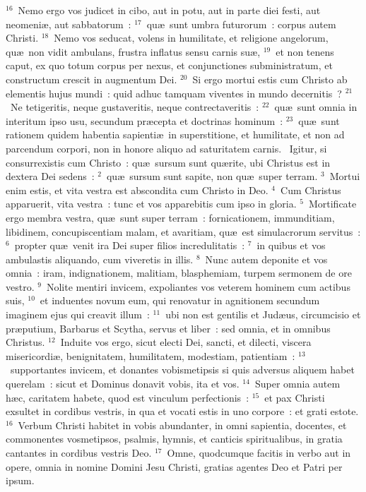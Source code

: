${}^{16}$~Nemo ergo vos judicet in cibo, aut in potu, aut in parte diei festi, aut neomeni\ae , aut sabbatorum~:
${}^{17}$~qu\ae\ sunt umbra futurorum~: corpus autem Christi.
${}^{18}$~Nemo vos seducat, volens in humilitate, et religione angelorum, qu\ae\ non vidit ambulans, frustra inflatus sensu carnis su\ae ,
${}^{19}$~et non tenens caput, ex quo totum corpus per nexus, et conjunctiones subministratum, et constructum crescit in augmentum Dei.
${}^{20}$~Si ergo mortui estis cum Christo ab elementis hujus mundi~: quid adhuc tamquam viventes in mundo decernitis~?
${}^{21}$~Ne tetigeritis, neque gustaveritis, neque contrectaveritis~:
${}^{22}$~qu\ae\ sunt omnia in interitum ipso usu, secundum pr\ae cepta et doctrinas hominum~:
${}^{23}$~qu\ae\ sunt rationem quidem habentia sapienti\ae\ in superstitione, et humilitate, et non ad parcendum corpori, non in honore aliquo ad saturitatem carnis.
~\lettrine[lines=10,image=true,loversize=0.05,lraise=-0.03]{I}{}gitur, si consurrexistis cum Christo~: qu\ae\ sursum sunt qu\ae rite, ubi Christus est in dextera Dei sedens~:
${}^{2}$~qu\ae\ sursum sunt sapite, non qu\ae\ super terram.
${}^{3}$~Mortui enim estis, et vita vestra est abscondita cum Christo in Deo.
${}^{4}$~Cum Christus apparuerit, vita vestra~: tunc et vos apparebitis cum ipso in gloria.
${}^{5}$~Mortificate ergo membra vestra, qu\ae\ sunt super terram~: fornicationem, immunditiam, libidinem, concupiscentiam malam, et avaritiam, qu\ae\ est simulacrorum servitus~:
${}^{6}$~propter qu\ae\ venit ira Dei super filios incredulitatis~:
${}^{7}$~in quibus et vos ambulastis aliquando, cum viveretis in illis.
${}^{8}$~Nunc autem deponite et vos omnia~: iram, indignationem, malitiam, blasphemiam, turpem sermonem de ore vestro.
${}^{9}$~Nolite mentiri invicem, expoliantes vos veterem hominem cum actibus suis,
${}^{10}$~et induentes novum eum, qui renovatur in agnitionem secundum imaginem ejus qui creavit illum~:
${}^{11}$~ubi non est gentilis et Jud\ae us, circumcisio et pr\ae putium, Barbarus et Scytha, servus et liber~: sed omnia, et in omnibus Christus.
${}^{12}$~Induite vos ergo, sicut electi Dei, sancti, et dilecti, viscera misericordi\ae , benignitatem, humilitatem, modestiam, patientiam~:
${}^{13}$~supportantes invicem, et donantes vobismetipsis si quis adversus aliquem habet querelam~: sicut et Dominus donavit vobis, ita et vos.
${}^{14}$~Super omnia autem h\ae c, caritatem habete, quod est vinculum perfectionis~:
${}^{15}$~et pax Christi exsultet in cordibus vestris, in qua et vocati estis in uno corpore~: et grati estote.
${}^{16}$~Verbum Christi habitet in vobis abundanter, in omni sapientia, docentes, et commonentes vosmetipsos, psalmis, hymnis, et canticis spiritualibus, in gratia cantantes in cordibus vestris Deo.
${}^{17}$~Omne, quodcumque facitis in verbo aut in opere, omnia in nomine Domini Jesu Christi, gratias agentes Deo et Patri per ipsum.


